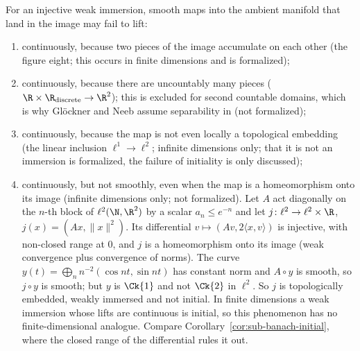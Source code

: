 \begin{remark}
  \label{rem:sub-mechanisms}
  For an injective weak immersion, smooth maps into the ambient manifold that land in the image
  may fail to lift:
  \begin{enumerate}
    \item continuously, because two pieces of the image accumulate on each other (the figure
      eight; this occurs in finite dimensions and is formalized);
    \item continuously, because there are uncountably many pieces ($\R \times \R_{\mathrm{discrete}}
      \to \R^2$); this is excluded for second countable domains, which is why Glöckner and Neeb
      assume separability in \cite[Thm.~9.2.15]{GN26} (not formalized);
    \item continuously, because the map is not even locally a topological embedding (the linear
      inclusion $\ell^1 \to \ell^2$; infinite dimensions only; that it is not an immersion is
      formalized, the failure of initiality is only discussed);
    \item continuously, but not smoothly, even when the map is a homeomorphism onto its image
      (infinite dimensions only; not formalized). Let $A$ act diagonally on the $n$-th block of
      $\ell^2(\N, \R^2)$ by a scalar $a_n \le e^{-n}$ and let
      $j \colon \ell^2 \to \ell^2 \times \R$, $j(x) = (Ax, \|x\|^2)$. Its differential
      $v \mapsto (Av, 2\langle x, v\rangle)$ is injective, with non-closed range at $0$, and $j$
      is a homeomorphism onto its image (weak convergence plus convergence of norms). The curve
      $y(t) = \bigoplus_n n^{-2}(\cos nt, \sin nt)$ has constant norm and $A \circ y$ is smooth,
      so $j \circ y$ is smooth; but $y$ is $\Ck{1}$ and not $\Ck{2}$ in $\ell^2$. So $j$ is
      topologically embedded, weakly immersed and not initial. In finite dimensions a weak
      immersion whose lifts are continuous is initial, so this phenomenon has no
      finite-dimensional analogue. Compare Corollary~\ref{cor:sub-banach-initial}, where the
      closed range of the differential rules it out.
  \end{enumerate}
\end{remark}


